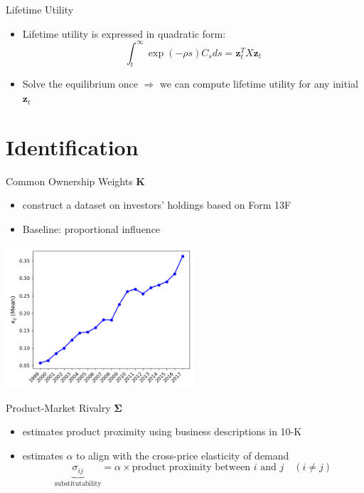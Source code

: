 \documentclass[
  10pt,
  aspectratio=169,   %
]{beamer}
\theoremstyle{plain}
\begin{document}
\begin{frame}{Lifetime Utility}

  \label{aggregation}
  \begin{itemize}
    \item Lifetime utility is expressed in quadratic form:
          \[
            \int_{t}^{\infty}\exp\left(-\rho s\right)C_{s}ds=\bm{z}_{t}^{T}X\bm{z}_{t}
          \]

          \hyperlink{X}{}
    \item Solve the equilibrium once $\Longrightarrow$ we can compute lifetime utility for any initial $\bm{z}_{t}$
  \end{itemize}
\end{frame}

\section{Identification}

\begin{frame}{Common Ownership Weights $\bm{K}$}
  \begin{itemize}
    \item \citet{Backus2021-yt} construct a dataset on investors' holdings based on Form 13F
    \item Baseline: \citet{Rotemberg1984-jz} proportional influence \hfill\hyperlink{rotemberg}{}
  \end{itemize}
  \begin{center}
    \includegraphics[width=7cm]{figures/kappa}
  \end{center}
\end{frame}

\begin{frame}{Product-Market Rivalry $\bm{\Sigma}$}

  \begin{itemize}
    \item \label{product_identification} \citet{Hoberg2016-jm} estimates product proximity using business descriptions in 10-K
          \medskip{}
    \item \citet{Pellegrino2024-dn} estimates $\alpha$ to align with the cross-price
          elasticity of demand
          \medskip{}
          \[
            \underbrace{\sigma_{ij}}_{\text{substitutability}}=\alpha\times\text{product proximity between }i\text{ and }j\quad\left(i\neq j\right)
          \]\hyperlink{micro_vs_ghl}{}
  \end{itemize}

\end{frame}
\end{document}
